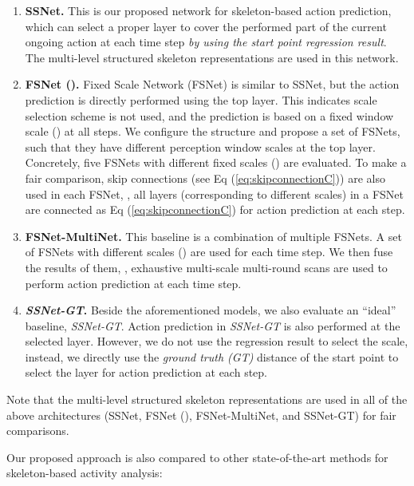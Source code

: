 \documentclass[10pt,twocolumn,letterpaper]{article}
\begin{document}
\begin{enumerate}
  \item
\textbf{SSNet.}
This is our proposed network for skeleton-based action prediction,
which can select a proper layer to cover the performed part of the current ongoing action at each time step \emph{by using the start point regression result}.
The multi-level structured skeleton representations are used in this network.




\item
\textbf{FSNet ().}
Fixed Scale Network (FSNet) is similar to SSNet,
but the action prediction is directly performed using the top layer.
This indicates scale selection scheme is not used,
and the prediction is based on a fixed window scale () at all steps.
We configure the structure and propose a set of FSNets,
such that they have different perception window scales at the top layer.
Concretely, five FSNets with different fixed scales () are evaluated.
To make a fair comparison,
skip connections (see Eq (\ref{eq:skipconnectionC})) are also used in each FSNet,
\ie, all layers (corresponding to different scales) in a FSNet are connected as Eq (\ref{eq:skipconnectionC}) for action prediction at each step.
\item
\textbf{FSNet-MultiNet.}
This baseline is a combination of multiple FSNets.
A set of FSNets with different scales () are used for each time step.
We then fuse the results of them, \ie, exhaustive multi-scale multi-round scans are used to perform action prediction at each time step.
  \item
\textbf{\emph{SSNet-GT}.}
Beside the aforementioned models, we also evaluate an ``ideal'' baseline, \emph{SSNet-GT}.
Action prediction in \emph{SSNet-GT} is also performed at the selected layer.
However, we do not use the regression result to select the scale,
instead, we directly use the \emph{ground truth (GT)} distance of the start point to select the layer for action prediction at each step.
\end{enumerate}


Note that the multi-level structured skeleton representations are used
in all of the above architectures (SSNet, FSNet (), FSNet-MultiNet, and SSNet-GT) for fair comparisons.

Our proposed approach is also compared to other state-of-the-art methods for skeleton-based activity analysis:
\end{document}
